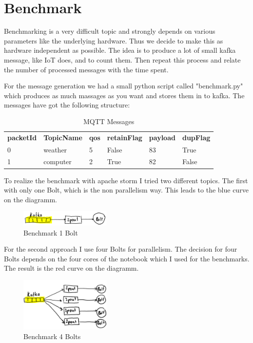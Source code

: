 \newpage
\section{Benchmark}

Benchmarking is a very difficult topic and strongly depends on various parameters like the underlying hardware.
Thus we decide to make this as hardware independent as possible.
The idea is to produce a lot of small kafka message, like IoT does,
and to count them. Then repeat this process and relate the number of processed messages with the time spent.

For the message generation we had a small python script called "benchmark.py" which produces as much massages as you want
and stores them in to kafka.
The messages have got the following structure:

\begin{table}[h!]
 \centering
 \begin{tabular}{llllll}
   \textbf{packetId}  & \textbf{TopicName} & \textbf{qos} & \textbf{retainFlag} & \textbf{payload} & \textbf{dupFlag} \\
   0 & weather & 5 & False & 83 & True \\
   1 & computer & 2 & True & 82 & False \\
 \end{tabular}
 \caption{MQTT Messages}
 \label{tab:messages}
\end{table}

To realize the benchmark with apache storm I tried two different topics.
The first with only one Bolt, which is the non parallelism way. This leads to the blue curve on the diagramm.
\begin{figure}[H]
\centering
\captionsetup{justification=centering}
\includegraphics[width=0.4\textwidth]{images/benchmark_topic1.png}
\caption[Benchmark 1 Bolt]{Benchmark 1 Bolt}
\end{figure}

For the second approach I use four Bolts for parallelism.
The decision for four Bolts depends on the four cores of the notebook which I used for the benchmarks.
The result is the red curve on the diagramm.

\begin{figure}[H]
\centering
\captionsetup{justification=centering}
\includegraphics[width=0.4\textwidth]{images/benchmark_topic2.png}
\caption[Benchmark 4 Bolts]{Benchmark 4 Bolts}
\end{figure}


